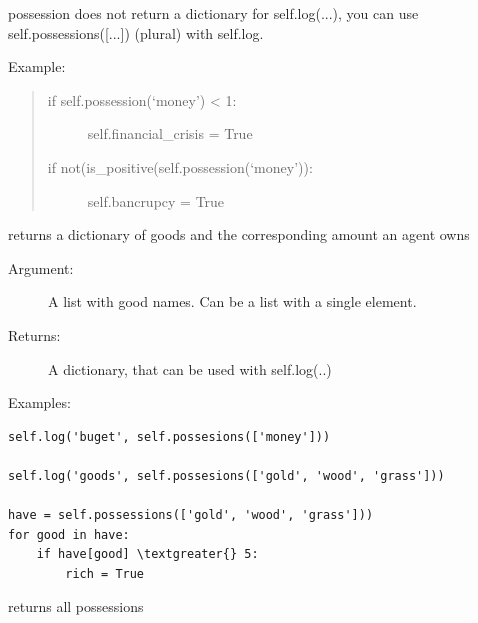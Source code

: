 \documentclass[letterpaper,10pt,english]{sphinxmanual}
\begin{document}
\begin{fulllineitems}
\begin{fulllineitems}
\begin{description}
\end{description}

possession does not return a dictionary for self.log(...), you can use self.possessions({[}...{]})
(plural) with self.log.

Example:
\begin{quote}
\begin{description}
\item[{if self.possession(`money') \textless{} 1:}] \leavevmode
self.financial\_crisis = True

\item[{if not(is\_positive(self.possession(`money')):}] \leavevmode
self.bancrupcy = True

\end{description}
\end{quote}

\end{fulllineitems}


\begin{fulllineitems}
\label{Agent_class:abce.Agent.possessions}
returns a dictionary of goods and the corresponding amount an agent owns
\begin{description}
\item[{Argument:}] \leavevmode
A list with good names. Can be a list with a single element.

\item[{Returns:}] \leavevmode
A dictionary, that can be used with self.log(..)

\end{description}

Examples:

\begin{Verbatim}[commandchars=\\\{\}]
self.log('buget', self.possesions(['money']))

self.log('goods', self.possesions(['gold', 'wood', 'grass']))

have = self.possessions(['gold', 'wood', 'grass']))
for good in have:
    if have[good] \textgreater{} 5:
        rich = True
\end{Verbatim}

\end{fulllineitems}


\begin{fulllineitems}
\label{Agent_class:abce.Agent.possessions_all}
returns all possessions


\end{fulllineitems}
\end{fulllineitems}
\end{document}
